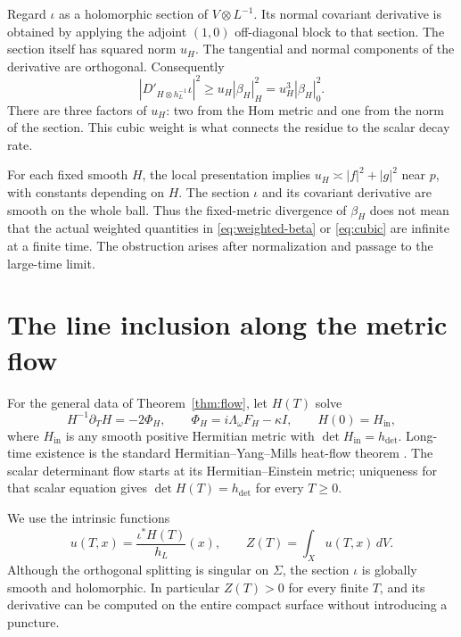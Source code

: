 \documentclass[11pt]{amsart}
\theoremstyle{definition}
\theoremstyle{remark}
\begin{document}
Regard $\iota$ as a holomorphic section of $V\otimes L^{-1}$. Its
normal covariant derivative is obtained by applying the adjoint
$(1,0)$ off-diagonal block to that section. The section itself has
squared norm $u_H$. The tangential and normal components of the derivative
are orthogonal. Consequently
\begin{equation}\label{eq:cubic}
 |D'_{H\otimes h_L^{-1}}\iota|^2
 \ge u_H|\beta_H|_H^2=u_H^3|\beta_H|_0^2.
\end{equation}
There are three factors of $u_H$: two from the Hom metric and one from
the norm of the section. This cubic weight is what connects the residue
to the scalar decay rate.

For each fixed smooth $H$, the local presentation implies
$u_H\asymp |f|^2+|g|^2$ near $p$, with constants depending on $H$.
The section $\iota$ and its covariant derivative are smooth on the whole
ball. Thus the fixed-metric
divergence of $\beta_H$ does not mean that the actual weighted quantities
in \eqref{eq:weighted-beta} or \eqref{eq:cubic} are infinite at a finite
time. The obstruction arises after normalization and passage to the
large-time limit.

\section{The line inclusion along the metric flow}\label{sec:flow}

For the general data of Theorem~\ref{thm:flow}, let $H(T)$ solve
\begin{equation}\label{eq:flow}
 H^{-1}\partial_T H=-2\Phi_H,
 \qquad\Phi_H=i\Lambda_\omega F_H-\kappa I,
 \qquad H(0)=H_{\mathrm{in}},
\end{equation}
where $H_{\mathrm{in}}$ is any smooth positive Hermitian metric with
$\det H_{\mathrm{in}}=h_{\det}$. Long-time existence is the standard
Hermitian--Yang--Mills heat-flow theorem \cite{donaldson1985,lzz2016}.
The scalar determinant flow starts at its Hermitian--Einstein metric;
uniqueness for that scalar equation gives
$\det H(T)=h_{\det}$ for every $T\ge0$.

We use the intrinsic functions
\begin{equation}\label{eq:u-z}
 u(T,x)=\frac{\iota^*H(T)}{h_L}(x),
 \qquad Z(T)=\int_X u(T,x)\,dV.
\end{equation}
Although the orthogonal splitting is singular on $\Sigma$, the section
$\iota$ is globally smooth and holomorphic. In particular $Z(T)>0$
for every finite $T$, and its derivative can be computed on the entire
compact surface without introducing a puncture.
\end{document}
